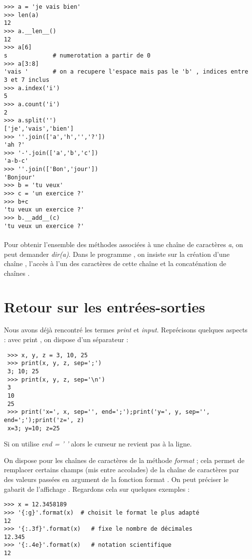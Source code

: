 \begin{lstlisting}
>>> a = 'je vais bien'
>>> len(a)
12
>>> a.__len__()
12
>>> a[6]
s             # numerotation a partir de 0
>>> a[3:8]
'vais '       # on a recupere l'espace mais pas le 'b' , indices entre 3 et 7 inclus
>>> a.index('i')
5
>>> a.count('i')
2
>>> a.split('')
['je','vais','bien']
>>> ''.join(['a','h','','?'])
'ah ?'
>>> '-'.join(['a','b','c'])
'a-b-c'
>>> ''.join(['Bon','jour'])
'Bonjour'
>>> b = 'tu veux'
>>> c = 'un exercice ?'
>>> b+c
'tu veux un exercice ?'
>>> b.__add__(c)
'tu veux un exercice ?'
\end{lstlisting}

\paragraph{}
Pour obtenir l'ensemble des méthodes associées à une chaîne de caractères \textit{a}, on peut demander \textit{dir(a)}. Dans le programme , on insiste sur la création d'une chaîne , l'accès à l'un des caractères de cette chaîne et la concaténation de chaînes .

\section{Retour sur les entrées-sorties}

Nous avons déjà rencontré les termes \textit{print} et \textit{input}. Reprécisons quelques aspects :
avec print , on dispose d'un séparateur :
\begin{lstlisting}
 >>> x, y, z = 3, 10, 25
 >>> print(x, y, z, sep=';')
 3; 10; 25
 >>> print(x, y, z, sep='\n')
 3
 10
 25
 >>> print('x=', x, sep='', end=';');print('y=', y, sep='', end=';');print('z=', z)
 x=3; y=10; z=25
\end{lstlisting}

Si on utilise \textit{end = ' '} alors le curseur ne revient pas à la ligne.\par
\par
On dispose pour les chaînes de caractères de la méthode \textit{format} ; cela permet de remplacer certains champs (mis entre accolades) de la chaîne de caractères par des valeurs passées en argument de la fonction format . On peut préciser le gabarit de l'affichage . Regardons cela sur quelques exemples :
\begin{lstlisting}
>>> x = 12.3458189
>>> '{:g}'.format(x)  # choisit le format le plus adapté
12
>>> '{:.3f}'.format(x)   # fixe le nombre de décimales
12.345
>>> '{:.4e}'.format(x)   # notation scientifique
12
\end{lstlisting}

